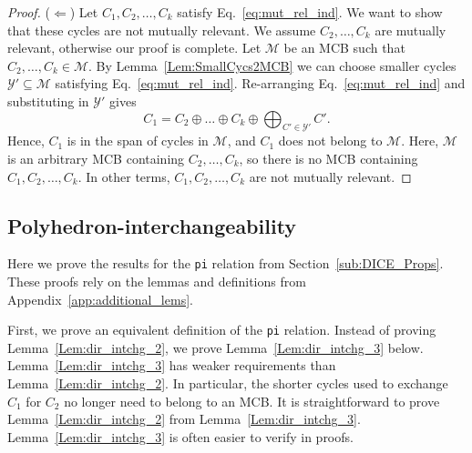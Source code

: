 \documentclass[fleqn,11pt]{article}
\newcommand\calM{\mathcal{M}}
\newcommand\calY{\mathcal{Y}}
\begin{document}
\begin{proof}
	($\Leftarrow$) Let $C_1,C_2,\hdots,C_k$ satisfy Eq.~\eqref{eq:mut_rel_ind}. We want to show that these cycles are not mutually relevant. We assume $C_2,\hdots,C_k$ are mutually relevant, otherwise our proof is complete. Let $\calM$ be an MCB such that $C_2,\hdots,C_k\in\calM$. By Lemma~\ref{Lem:SmallCycs2MCB} we can choose smaller cycles $\calY'\subseteq\calM$ satisfying Eq.~\eqref{eq:mut_rel_ind}. Re-arranging Eq.~\eqref{eq:mut_rel_ind} and substituting in $\calY'$ gives
	\begin{equation}
		C_1 = C_2\oplus\hdots\oplus C_k\oplus\bigoplus_{C'\in\calY'}C'.
		\label{eq:C_exp_all_mut_rel}
	\end{equation}
	Hence, $C_1$ is in the span of cycles in $\calM$, and $C_1$ does not belong to $\calM$. 
	Here, $\calM$ is an arbitrary MCB containing $C_2,\hdots,C_k$, so there is no MCB containing $C_1,C_2,\hdots,C_k$. In other terms, $C_1,C_2,\hdots,C_k$ are not mutually relevant.
\end{proof}


\subsection{Polyhedron-interchangeability}
\label{app:DICE_Proofs}


Here we prove the results for the {\tt pi} relation from Section~\ref{sub:DICE_Props}. These proofs rely on the lemmas and definitions from Appendix~\ref{app:additional_lems}.

First, we prove an equivalent definition of the {\tt pi} relation. Instead of proving Lemma~\ref{Lem:dir_intchg_2}, we prove Lemma~\ref{Lem:dir_intchg_3} below. Lemma~\ref{Lem:dir_intchg_3} has weaker requirements than Lemma~\ref{Lem:dir_intchg_2}. In particular, the shorter cycles used to exchange $C_1$ for $C_2$ no longer need to belong to an MCB. It is straightforward to prove Lemma~\ref{Lem:dir_intchg_2} from Lemma~\ref{Lem:dir_intchg_3}. Lemma~\ref{Lem:dir_intchg_3} is often easier to verify in proofs.
\end{document}
